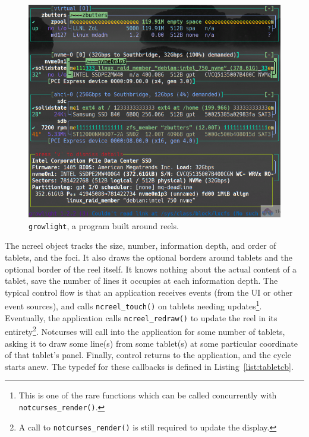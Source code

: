 \documentclass[letterpaper,10pt]{article}
\begin{document}
\begin{figure}
  \centering
  \includegraphics[width=.75\linewidth]{media/growlight1.png}
  \caption{\texttt{growlight}, a program built around reels.}
  \label{fig:growlight1}
\end{figure}

The ncreel object tracks the size, number, information depth, and order of
tablets, and the foci. It also draws the optional borders around tablets and
the optional border of the reel itself. It knows nothing about the actual
content of a tablet, save the number of lines it occupies at each information
depth. The typical control flow is that an application receives events (from
the UI or other event sources), and calls \texttt{ncreel\_touch()} on tablets
needing updates\footnote{This is one of the rare functions which can be called
concurrently with \texttt{notcurses\_render()}.}. Eventually, the application
calls \texttt{ncreel\_redraw()} to update the reel in its
entirety\footnote{A call to \texttt{notcurses\_render()} is still required to
update the display.}. Notcurses will call into the application for some number
of tablets, asking it to draw some line(s) from some tablet(s) at some
particular coordinate of that tablet's panel. Finally, control returns to the
application, and the cycle starts anew. The typedef for these callbacks is
defined in Listing~\ref{list:tabletcb}.
\end{document}
